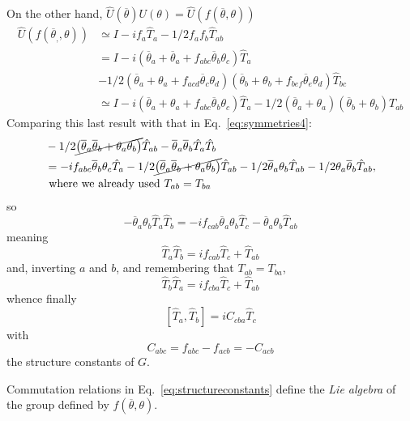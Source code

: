 \documentclass[12pt]{article}
\newcommand{\be}{\begin{equation}}
\newcommand{\ee}{\end{equation}}
\begin{document}
On the other hand, 
$\hat{U}(\overline{\theta}) U(\theta)=\hat{U}(f(\overline{\theta}, \theta))$
\be
\begin{aligned} 
\hat{U}\left(f\left(\overline{\theta}_{,}, \theta\right)\right) 
&\simeq I-i f_{a} \hat{T}_{a}-1 / 2 f_{a} f_{b} \hat{T}_{a b} \\ 
&=I-i(\overline{\theta}_{a}+\overline{\theta}_{a}+f_{a b c} \overline{\theta}_{b} \theta_{c}) \hat{T}_{a} \\ 
&-1 / 2\left(\overline{\theta}_{a}+\theta_{a}+f_{a c d} \overline{\theta}_{c} \theta_{d}\right)\left(\overline{\theta}_{b}+\theta_{b}+f_{b e f} \overline{\theta}_{e} \theta_{d}\right) \hat{T}_{b c}\\
&\simeq I-i\left(\overline{\theta}_{a}+\theta_{a}+f_{a b c} \overline{\theta}_{b} \theta_{c}\right) \hat{T}_{a}
-1 / 2\left(\overline{\theta}_{a}+\theta_{a}\right)\left(\overline{\theta}_{b}+\theta_{b}\right) T_{a b}
\end{aligned}
\ee
Comparing this last result with that in Eq.~\eqref{eq:symmetries4}:
\[
\begin{aligned}
&-1 / 2\cancel{\left(\overline{\theta}_{a} \overline{\theta}_{b}+\theta_{a} \theta_{b}\right)} \hat{T}_{a b}
-\overline{\theta}_{a} \overline{\theta}_{b} \hat{T}_{a} \hat{T}_{b} \\ 
&=-i f_{a b c} \overline{\theta}_{b} \theta_{c} \hat{T}_{a}
-1 / 2\cancel{\left(\overline{\theta}_{a} \overline{\theta}_{b}+\theta_{a} \theta_{b}\right)} \hat{T}_{a b}
-1 / 2 \overline{\theta}_{a} \theta_{b} \hat{T}_{a b}-1 / 2 \theta_{a} \overline{\theta}_{b} \hat{T}_{a b},\\
&\text{ where we already used $T_{ab} = T_{ba}$}
\end{aligned}
\]
so
\[
-\overline{\theta}_{a} \theta_{b} \hat{T}_{a} \hat{T}_{b}=-i f_{c a b} \overline{\theta}_{a} \theta_{b} \hat{T}_{c}-\overline{\theta}_{a} \theta_{b} \hat{T}_{a b}
\]
meaning 
\setcounter{equation}{36}
\be
\hat{T}_{a} \hat{T}_{b}=i f_{c a b} \hat{T}_{c}+\hat{T}_{a b}
\ee
and, inverting $a$ and $b$, and remembering that $T_{ab} = T_{ba}$,
\[
\hat{T}_{b} \hat{T}_{a}=i f_{c b a} \hat{T}_{c}+\hat{T}_{a b}
\]
whence finally
\be
\left[\hat{T}_{a}, \hat{T}_{b}\right]=i C_{c b a} \hat{T}_{c}
\ee
with
\be
C_{a b c}=f_{a b c}-f_{a c b}=-C_{a c b}
\label{eq:structureconstants}
\ee
the structure constants of $G$.

Commutation relations in Eq.~\eqref{eq:structureconstants} define the
\emph{Lie algebra} of the group defined by \(f(\overline{\theta}, \theta)\).
\end{document}

